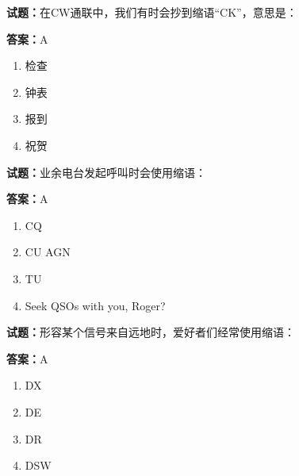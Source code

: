\documentclass{ctexbook}
\begin{document}




\vspace{1em}

\textbf{试题：}在CW通联中，我们有时会抄到缩语“CK”，意思是： 

\textbf{答案：}A 

\begin{enumerate}[leftmargin=3em]
  \item 检查 

  \item 钟表 

  \item 报到 

  \item 祝贺 

\end{enumerate}





\vspace{1em}

\textbf{试题：}业余电台发起呼叫时会使用缩语： 

\textbf{答案：}A 

\begin{enumerate}[leftmargin=3em]
  \item CQ 

  \item CU AGN 

  \item TU 


  \item Seek QSOs with you, Roger? 

\end{enumerate}





\vspace{1em}

\textbf{试题：}形容某个信号来自远地时，爱好者们经常使用缩语： 

\textbf{答案：}A 

\begin{enumerate}[leftmargin=3em]
  \item DX 

  \item DE 

  \item DR 

  \item DSW 

\end{enumerate}
\end{document}
